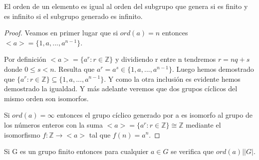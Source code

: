 \begin{proposition}
El orden de un elemento es igual al orden del subgrupo que genera si es finito y es infinito si el subgrupo generado es infinito.
\end{proposition}

\begin{proof}
Veamos en primer lugar que si $ord(a) = n$ entonces $<a> = \{1,a,...,a^{n-1}\}$.

Por definición $<a> = \{a^r:r \in \mathbb{Z}\}$ y dividiendo r entre n tendremos $r = nq + s$ donde $0 \le s < n$. Resulta que $a^r = a^s \in \{1,a,...,a^{n-1}\}$. Luego hemos demostrado que $\{a^r:r \in \mathbb{Z}\} \subseteq \{1,a,...,a^{n-1}\}$. Y como la otra inclusión es evidente hemos demostrado la igualdad. Y más adelante veremos que dos grupos cíclicos del mismo orden son isomorfos.

Si $ord(a) = \infty$ entonces el grupo cíclico generado por a es isomorfo al grupo de los números enteros con la suma $<a> = \{a^r:r \in \mathbb{Z}\} \cong \mathbb{Z}$ mediante el isomorfismo $f:\mathbb{Z} \rightarrow <a>$ tal que $f(n) = a^n$.
\end{proof}

\begin{corollary}
Si G es un grupo finito entonces para cualquier $a \in G$ se verifica que $ord(a) | |G|$.
\end{corollary}

